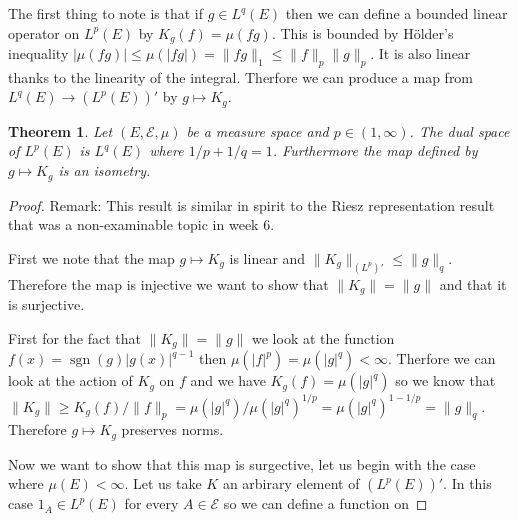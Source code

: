 \documentclass[11pt]{article}
\DeclareMathOperator{\sgn}{sgn}
\newtheorem{thm}{Theorem}[section]
\theoremstyle{definition}
\theoremstyle{remark}
\begin{document}
The first thing to note is that if $g \in L^q(E)$ then we can define a bounded linear operator on $L^p(E)$ by $K_g(f) = \mu(fg)$. This is bounded by H\"older's inequality $|\mu(fg)| \leq \mu(|fg|) = \|fg\|_1 \leq \|f\|_p \|g\|_p$. It is also linear thanks to the linearity of the integral. Therfore we can produce a map from $L^q(E) \rightarrow (L^p(E))'$ by $g \mapsto K_g$.
\begin{thm}
Let $(E, \mathcal{E}, \mu)$ be a measure space and $p \in (1, \infty)$. The dual space of $L^p(E)$ is $L^q(E)$ where $1/p +1/q = 1$. Furthermore the map defined by $g \mapsto K_g$ is an isometry.
\end{thm}
\begin{proof}
Remark: This result is similar in spirit to the Riesz representation result that was a non-examinable topic in week 6. 

First we note that the map $g \mapsto K_g$ is linear and $\|K_g\|_{(L^p)'} \leq \|g\|_q$. Therefore the map is injective we want to show that $\|K_g\| = \|g\|$ and that it is surjective. 

First for the fact that $\|K_g\| = \|g\|$ we look at the function $f(x) = \sgn(g)|g(x)|^{q-1}$ then $\mu(|f|^p) = \mu(|g|^q) < \infty$. Therfore we can look at the action of $K_g$ on $f$ and we have $K_g(f) = \mu(|g|^q)$ so we know that $\|K_g\| \geq K_g(f)/\|f\|_p = \mu(|g|^q)/\mu(|g|^q)^{1/p} = \mu(|g|^q)^{1-1/p} = \|g\|_q$. Therefore $g \mapsto K_g$ preserves norms.

Now we want to show that this map is surgective, let us begin with the case where $\mu(E)<\infty$. Let us take $K$ an arbirary element of $(L^p(E))'$. In this case $1_A \in L^p(E)$ for every $A \in \mathcal{E}$ so we can define a function on 
\end{proof}
\end{document}
